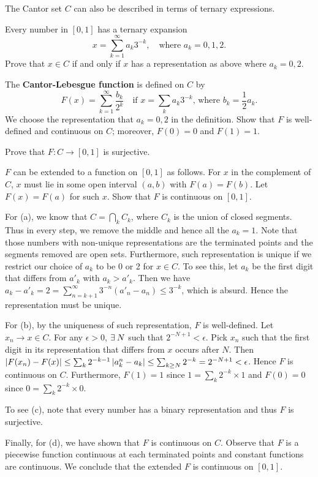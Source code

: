 \begin{exercise}
    The Cantor set $C$ can also be described in terms of ternary 
    expressions. 
    \begin{thmenum}
        \item Every number in $[0,1]$ has a ternary expansion
        \[
            x = \sum_{k=1}^\infty a_k3^{-k},
            \quad\text{where $a_k = 0,1,2$.}
        \]
        Prove that $x\in C$ if and only if $x$ has a 
        representation as above where $a_k = 0,2$.
        \item The \textbf{Cantor-Lebesgue function} is defined 
        on $C$ by
        \[
            F(x) = \sum_{k=1}^\infty \frac{b_k}{2^k} 
            \quad\text{if $x = \sum_k a_k3^{-k}$, where 
            $b_k = \frac{1}{2}a_k$.}
        \]
        We choose the representation that $a_k=0,2$ in the 
        definition. Show that $F$ is well-defined and continuous 
        on $C$; moreover, $F(0) = 0$ and $F(1)=1$.
        \item Prove that $F:C\to[0,1]$ is surjective.
        \item $F$ can be extended to a function on $[0,1]$ as 
        follows. For $x$ in the complement of $C$, $x$ must lie 
        in some open interval $(a,b)$ with $F(a) = F(b)$. Let 
        $F(x) = F(a)$ for such $x$. Show that $F$ is continuous 
        on $[0,1]$. 
    \end{thmenum}
\end{exercise}
\begin{pf}
    For (a), we know that $C = \bigcap_k C_k$, where $C_k$ is 
    the union of closed segments. Thus in every step, we remove 
    the middle and hence all the $a_k=1$. Note that those 
    numbers with non-unique representations are the terminated 
    points and the segments removed are open sets. Furthermore, 
    such representation is unique if we restrict our choice of 
    $a_k$ to be 0 or 2 for $x\in C$. To see this, let $a_k$ be 
    the first digit that differs from $a'_k$ with $a_k>a'_k$. 
    Then we have $a_k-a'_k = 2 = \sum_{n=k+1}^\infty3^{-n}
    (a'_n-a_n) \leq 3^{-k}$, 
    which is absurd. Hence the representation must be unique.

    For (b), by the uniqueness of such representation, $F$ is 
    well-defined. Let $x_n\to x\in C$. For any 
    $\epsilon>0$, $\exists\: N$ such that $2^{-N+1}<\epsilon$. 
    Pick $x_n$ such that the first digit in its representation 
    that differs from $x$ occurs after $N$. Then 
    $\left\lvert {F(x_n)-F(x)} \right\rvert \leq \sum_k 2^{-k-1}\left\lvert {a^n_k-a_k} \right\rvert 
    \leq \sum_{k\geq N} 2^{-k} = 2^{-N+1}<\epsilon$. Hence $F$ 
    is continuous on $C$. Furthermore, $F(1) = 1$ since 
    $1=\sum_k2^{-k}\times1$ and $F(0) = 0$ since 
    $0=\sum_k2^{-k}\times0$.

    To see (c), note that every number has a binary 
    representation and thus $F$ is surjective.

    Finally, for (d), we have shown that $F$ is continuous on 
    $C$. Observe that $F$ is a piecewise function continuous at 
    each terminated points and constant functions are continuous. 
    We conclude that the extended $F$ is continuous on $[0,1]$. 
\end{pf}

